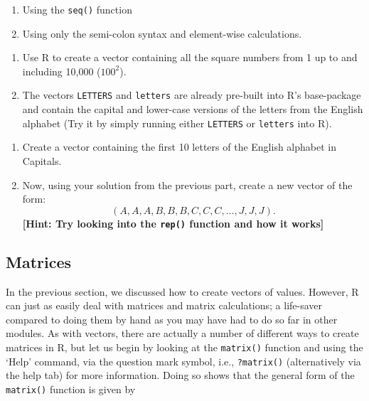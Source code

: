 \documentclass[
]{book}
\providecommand{\tightlist}{%
  \setlength{\itemsep}{0pt}\setlength{\parskip}{0pt}}
\theoremstyle{definition}
\theoremstyle{definition}
\theoremstyle{definition}
\theoremstyle{definition}
\theoremstyle{remark}
\begin{document}
\begin{enumerate}
\def\labelenumi{\roman{enumi}.}
\tightlist
\item
  Using the \texttt{seq()} function
\item
  Using only the semi-colon syntax and element-wise calculations.
\end{enumerate}

\begin{enumerate}
\def\labelenumi{\arabic{enumi}.}
\setcounter{enumi}{2}
\item
  Use R to create a vector containing all the square numbers from 1 up to and including 10,000 (\(100^2\)).
\item
  The vectors \texttt{LETTERS} and \texttt{letters} are already pre-built into R's base-package and contain the capital and lower-case versions of the letters from the English alphabet (Try it by simply running either \texttt{LETTERS} or \texttt{letters} into R).
\end{enumerate}

\begin{enumerate}
\def\labelenumi{\roman{enumi}.}
\tightlist
\item
  Create a vector containing the first 10 letters of the English alphabet in Capitals.
\item
  Now, using your solution from the previous part, create a new vector of the form:
  \begin{equation*}
  (A, A, A, B, B, B, C, C, C, \ldots, J, J, J).
  \end{equation*}
  \textbf{{[}Hint: Try looking into the \texttt{rep()} function and how it works{]}}
\end{enumerate}

\hypertarget{matrices}{%
\subsection{Matrices}\label{matrices}}

In the previous section, we discussed how to create vectors of values. However, R can just as easily deal with matrices and matrix calculations; a life-saver compared to doing them by hand as you may have had to do so far in other modules. As with vectors, there are actually a number of different ways to create matrices in R, but let us begin by looking at the \texttt{matrix()} function and using the `Help' command, via the question mark symbol, i.e., \texttt{?matrix()} (alternatively via the help tab) for more information. Doing so shows that the general form of the \texttt{matrix()} function is given by
\end{document}
